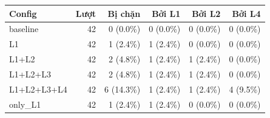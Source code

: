 \begin{tabular}{lrrrrr}
\toprule
Config & Lượt & Bị chặn & Bởi L1 & Bởi L2 & Bởi L4 \\
\midrule
baseline & 42 & 0 (0.0\%) & 0 (0.0\%) & 0 (0.0\%) & 0 (0.0\%) \\
L1 & 42 & 1 (2.4\%) & 1 (2.4\%) & 0 (0.0\%) & 0 (0.0\%) \\
L1+L2 & 42 & 2 (4.8\%) & 1 (2.4\%) & 1 (2.4\%) & 0 (0.0\%) \\
L1+L2+L3 & 42 & 2 (4.8\%) & 1 (2.4\%) & 1 (2.4\%) & 0 (0.0\%) \\
L1+L2+L3+L4 & 42 & 6 (14.3\%) & 1 (2.4\%) & 1 (2.4\%) & 4 (9.5\%) \\
only\_L1 & 42 & 1 (2.4\%) & 1 (2.4\%) & 0 (0.0\%) & 0 (0.0\%) \\
\bottomrule
\end{tabular}
